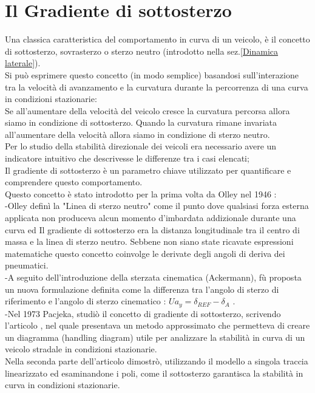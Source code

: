 \chapter{Il Gradiente di sottosterzo}
\label{cha:cap2}
Una classica caratteristica del comportamento in curva di un veicolo, è il concetto di
sottosterzo, sovrasterzo o sterzo neutro (introdotto nella sez.\ref{Dinamica laterale}).\\
Si può esprimere questo concetto (in modo semplice) basandosi sull’interazione tra la velocità di avanzamento e la 
curvatura durante la percorrenza di una curva in condizioni stazionarie:\\
Se all’aumentare della velocità del veicolo cresce la curvatura percorsa allora 
siamo in condizione di sottosterzo.
Quando la curvatura rimane invariata all’aumentare della velocità allora siamo in
condizione di sterzo neutro.\\
Per lo studio della stabilità direzionale dei veicoli era necessario avere un indicatore intuitivo
che descrivesse le differenze tra i casi elencati;\\ 
Il gradiente di sottosterzo è un parametro chiave utilizzato per quantificare e comprendere questo
comportamento.\\
Questo concetto è stato introdotto per la prima volta da Olley nel 1946 \cite{Olley1946RoadMO}:\\
-Olley definì la "Linea di sterzo neutro" come il punto dove qualsiasi forza esterna applicata non 
produceva alcun momento d'imbardata addizionale durante una curva ed Il gradiente di sottosterzo
era la distanza longitudinale tra il centro di massa e la linea di sterzo neutro.
Sebbene non siano state ricavate espressioni matematiche questo concetto coinvolge le derivate degli
angoli di deriva dei pneumatici.\\
-A seguito dell'introduzione della sterzata cinematica (Ackermann), fù proposta un nuova formulazione definita come la differenza tra l'angolo di sterzo di riferimento e l'angolo di sterzo cinematico : $Ua_y = \delta_{REF} - \delta_A$ \cite{society1965vehicle}.\\
-Nel 1973 Pacjeka, studiò il concetto di gradiente di sottosterzo, scrivendo l'articolo \cite{doi:10.1080/00423117308968439}, nel quale presentava un metodo approssimato che permetteva di
creare un diagramma (handling diagram) utile per analizzare la stabilità in curva di un veicolo 
stradale in condizioni stazionarie.\\
Nella seconda parte dell'articolo \cite{doi:10.1080/00423117308968440} dimostrò, utilizzando il modello a singola traccia linearizzato ed esaminandone i poli, come il sottosterzo garantisca la stabilità in curva in condizioni stazionarie.\\
